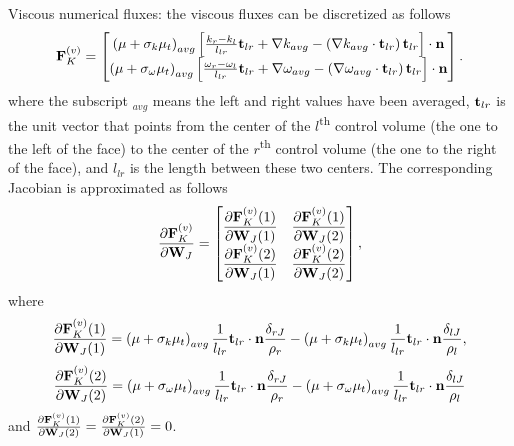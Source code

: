 \documentclass[oneside,a4paper,11pt]{report}
\begin{document}
Viscous numerical fluxes:
the viscous fluxes can be discretized as follows
\begin{equation}
    \mathbf{F}^{(v)}_K = \begin{bmatrix}
    \left ( \mu + \sigma_k \mu_t \right)_{avg} \left [ \frac{k_r - k_l}{l_{lr}} \mathbf{t}_{lr} + \nabla k_{avg} - \left ( \nabla k_{avg} \cdot \mathbf{t}_{lr} \right) \mathbf{t}_{lr} \right ] \cdot \mathbf{n} \\ 
    \left ( \mu + \sigma_\omega \mu_t \right)_{avg} \left [ \frac{\omega_r - \omega_l}{l_{lr}} \mathbf{t}_{lr} + \nabla \omega_{avg} - \left ( \nabla \omega_{avg} \cdot \mathbf{t}_{lr} \right) \mathbf{t}_{lr} \right ] \cdot \mathbf{n}
    \end{bmatrix}.
\end{equation}
where the subscript $_{avg}$ means the left and right values have been averaged, $\mathbf{t}_{lr}$ is the unit vector that points from the center of the $l$\textsuperscript{th} control volume (the one to the left of the face) to the center of the $r$\textsuperscript{th} control volume (the one to the right of the face), and $l_{lr}$ is the length between these two centers. The corresponding Jacobian is approximated as follows
\begin{equation}
    \frac{\partial \mathbf{F}^{(v)}_K}{\partial \mathbf{W}_J} = \begin{bmatrix}
    \dfrac{\partial \mathbf{F}^{(v)}_K(1)}{\partial \mathbf{W}_J(1)} & \dfrac{\partial \mathbf{F}^{(v)}_K(1)}{\partial \mathbf{W}_J(2)} \\
    \dfrac{\partial \mathbf{F}^{(v)}_K(2)}{\partial \mathbf{W}_J(1)} & \dfrac{\partial \mathbf{F}^{(v)}_K(2)}{\partial \mathbf{W}_J(2)} \end{bmatrix},
\end{equation}
where 
\begin{equation}
    \frac{\partial \mathbf{F}^{(v)}_K(1)}{\partial \mathbf{W}_J(1)} =
    \left ( \mu + \sigma_k \mu_t \right)_{avg} \frac{1}{l_{lr}} \mathbf{t}_{lr} \cdot \mathbf{n} \frac{\delta_{rJ}}{\rho_r} - \left ( \mu + \sigma_k \mu_t \right)_{avg} \frac{1}{l_{lr}} \mathbf{t}_{lr} \cdot \mathbf{n} \frac{\delta_{lJ}}{\rho_l},
\end{equation}
\begin{equation}
    \frac{\partial \mathbf{F}^{(v)}_K(2)}{\partial \mathbf{W}_J(2)} = \left ( \mu + \sigma_\omega \mu_t \right)_{avg} \frac{1}{l_{lr}} \mathbf{t}_{lr} \cdot \mathbf{n} \frac{\delta_{rJ}}{\rho_r} - \left ( \mu + \sigma_\omega \mu_t \right)_{avg} \frac{1}{l_{lr}} \mathbf{t}_{lr} \cdot \mathbf{n} \frac{\delta_{lJ}}{\rho_l} 
\end{equation}
and $\frac{\partial \mathbf{F}^{(v)}_K(1)}{\partial \mathbf{W}_J(2)} = \frac{\partial \mathbf{F}^{(v)}_K(2)}{\partial \mathbf{W}_J(1)} = 0$.
\end{document}
